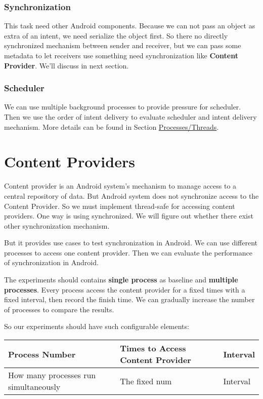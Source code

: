 \documentclass[11pt]{article}
\begin{document}
\subsubsection{Synchronization}
\label{sec-3-2-2}
This task need other Android components.
Because we can not pass an object as extra of an intent, we need serialize the object first.
So there no directly synchronized mechanism between sender and receiver,
but we can pass some metadata to let receivers use something need synchronization like \textbf{Content Provider}. We'll discuss in next section.

\subsubsection{Scheduler}
\label{sec-3-2-3}
We can use multiple background processes to provide pressure for scheduler.
Then we use the order of intent delivery to evaluate scheduler and intent delivery mechanism. More details can be found in Section \hyperref[Processes/Threads]{Processes/Threads}.

\section{Content Providers}
\label{sec-4}
Content provider is an Android system's mechanism to manage access to a central repository of data.
But Android system does not synchronize access to the Content Provider.
So we must implement thread-safe for accessing content providers.
One way is using synchronized. We will figure out whether there exist other synchronization mechanism.

But it provides use cases to test synchronization in Android. We can use different processes to access one content provider.
Then we can evaluate the performance of synchronization in Android.

The experiments should contains \textbf{single process} as baseline and \textbf{multiple processes}.
Every process access the content provider for a fixed times with a fixed interval, then record the finish time.
We can gradually increase the number of processes to compare the results.

So our experiments should have such configurable elements:

\begin{center}
\begin{tabular}{l|l|l}
Process Number & Times to Access Content Provider & Interval\\
\hline
How many processes run simultaneously & The fixed num & Interval\\
\end{tabular}
\end{center}
\end{document}
